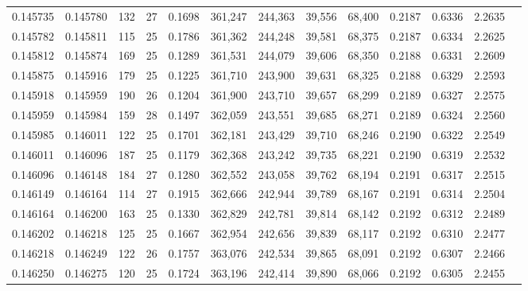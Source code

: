 \begin{tabular}{rrrrrrrrrrrrr}
0.145735 & 0.145780 & 132 &  27 &                                     0.1698 & 361,247 & 244,363 &  39,556 &  68,400 & 0.2187 & 0.6336 & 2.2635 \\
0.145782 & 0.145811 & 115 &  25 &                                     0.1786 & 361,362 & 244,248 &  39,581 &  68,375 & 0.2187 & 0.6334 & 2.2625 \\
0.145812 & 0.145874 & 169 &  25 &                                     0.1289 & 361,531 & 244,079 &  39,606 &  68,350 & 0.2188 & 0.6331 & 2.2609 \\
0.145875 & 0.145916 & 179 &  25 &                                     0.1225 & 361,710 & 243,900 &  39,631 &  68,325 & 0.2188 & 0.6329 & 2.2593 \\
0.145918 & 0.145959 & 190 &  26 &                                     0.1204 & 361,900 & 243,710 &  39,657 &  68,299 & 0.2189 & 0.6327 & 2.2575 \\
0.145959 & 0.145984 & 159 &  28 &                                     0.1497 & 362,059 & 243,551 &  39,685 &  68,271 & 0.2189 & 0.6324 & 2.2560 \\
0.145985 & 0.146011 & 122 &  25 &                                     0.1701 & 362,181 & 243,429 &  39,710 &  68,246 & 0.2190 & 0.6322 & 2.2549 \\
0.146011 & 0.146096 & 187 &  25 &                                     0.1179 & 362,368 & 243,242 &  39,735 &  68,221 & 0.2190 & 0.6319 & 2.2532 \\
0.146096 & 0.146148 & 184 &  27 &                                     0.1280 & 362,552 & 243,058 &  39,762 &  68,194 & 0.2191 & 0.6317 & 2.2515 \\
0.146149 & 0.146164 & 114 &  27 &                                     0.1915 & 362,666 & 242,944 &  39,789 &  68,167 & 0.2191 & 0.6314 & 2.2504 \\
0.146164 & 0.146200 & 163 &  25 &                                     0.1330 & 362,829 & 242,781 &  39,814 &  68,142 & 0.2192 & 0.6312 & 2.2489 \\
0.146202 & 0.146218 & 125 &  25 &                                     0.1667 & 362,954 & 242,656 &  39,839 &  68,117 & 0.2192 & 0.6310 & 2.2477 \\
0.146218 & 0.146249 & 122 &  26 &                                     0.1757 & 363,076 & 242,534 &  39,865 &  68,091 & 0.2192 & 0.6307 & 2.2466 \\
0.146250 & 0.146275 & 120 &  25 &                                     0.1724 & 363,196 & 242,414 &  39,890 &  68,066 & 0.2192 & 0.6305 & 2.2455 \\

\end{tabular}
